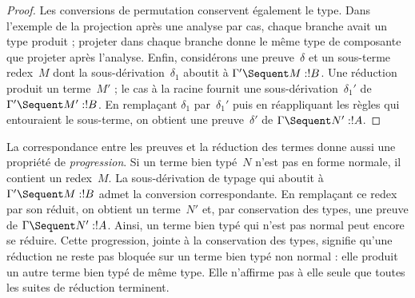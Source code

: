 \documentclass[../../../include/open-logic-section]{subfiles}
\begin{document}
\begin{proof}
Les conversions de permutation conservent également
le type. Dans l'exemple de la projection après une
analyse par cas, chaque branche avait un type produit ;
projeter dans chaque branche donne le même type de
composante que projeter après l'analyse.
Enfin, considérons une preuve~$\delta$ et un sous-terme
redex~$M$ dont la sous-dérivation~$\delta_1$ aboutit
à $\Gamma' \Sequent M:!B$. Une réduction produit
un terme~$M'$ ; le cas à la racine fournit une
sous-dérivation~$\delta_1'$ de
$\Gamma' \Sequent M':!B$.
En remplaçant $\delta_1$ par~$\delta_1'$ puis en
réappliquant les règles qui entouraient le sous-terme,
on obtient une preuve~$\delta'$ de
$\Gamma \Sequent N':!A$.
\end{proof}

La correspondance entre les preuves et la réduction
des termes donne aussi une propriété de
\emph{progression}.
Si un terme bien typé~$N$ n'est pas en forme normale,
il contient un redex~$M$. La sous-dérivation de typage
qui aboutit à $\Gamma' \Sequent M:!B$ admet la conversion
correspondante. En remplaçant ce redex par son réduit,
on obtient un terme~$N'$ et, par conservation des types,
une preuve de $\Gamma \Sequent N':!A$.
Ainsi, un terme bien typé qui n'est pas normal peut
encore se réduire. Cette progression, jointe à la
conservation des types, signifie qu'une réduction
ne reste pas bloquée sur un terme bien typé non normal :
elle produit un autre terme bien typé de même type.
Elle n'affirme pas à elle seule que toutes les suites
de réduction terminent.
\end{document}
